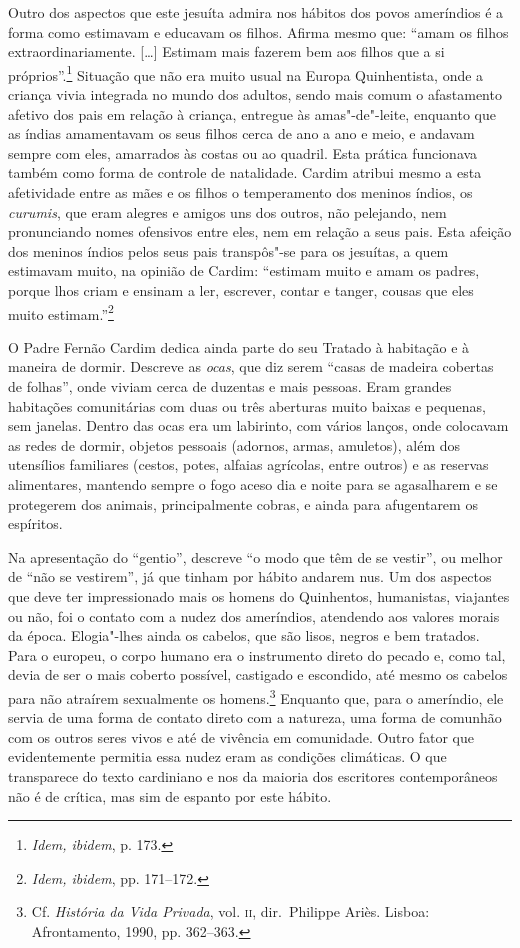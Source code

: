 Outro dos aspectos que este jesuíta admira nos hábitos dos povos
ameríndios é a forma como estimavam e educavam os filhos. Afirma mesmo
que: ``amam os filhos extraordinariamente. [\ldots{}] Estimam
mais fazerem bem aos filhos que a si próprios''.\footnote{ \textit{Idem, ibidem}, 
p. 173.} Situação que não era muito usual na
Europa Quinhentista, onde a criança vivia integrada no mundo dos
adultos, sendo mais comum o afastamento afetivo dos pais em relação à
criança, entregue às amas"-de"-leite, enquanto que as índias amamentavam
os seus filhos cerca de ano a ano e meio, e andavam sempre com eles,
amarrados às costas ou ao quadril. Esta prática funcionava também como
forma de controle de natalidade. Cardim atribui mesmo a esta
afetividade entre as mães e os filhos o temperamento dos meninos
índios, os \textit{curumis}, que eram alegres e amigos uns dos outros,
não pelejando, nem pronunciando nomes ofensivos entre eles, nem em
relação a seus pais. Esta afeição dos meninos índios pelos seus pais
transpôs"-se para os jesuítas, a quem estimavam muito, na opinião de
Cardim: ``estimam muito e amam os padres, porque lhos
criam e ensinam a ler, escrever, contar e tanger, cousas que eles muito
estimam.''\footnote{ \textit{Idem, ibidem}, pp. 171--172.} 

 O Padre Fernão Cardim dedica ainda parte do seu Tratado 
à habitação e à maneira de dormir. Descreve as \textit{ocas}, que diz
serem ``casas de madeira cobertas de folhas'', onde
viviam cerca de duzentas e mais pessoas. Eram grandes habitações
comunitárias com duas ou três aberturas muito baixas e pequenas, sem
janelas. Dentro das ocas era um labirinto, com vários lanços, 
onde colocavam as redes de dormir, objetos pessoais (adornos, armas, amuletos), além dos
utensílios familiares (cestos, potes, alfaias agrícolas, entre outros)
e as reservas alimentares, mantendo sempre o fogo aceso dia e noite
para se agasalharem e se protegerem dos animais, principalmente cobras,
e ainda para afugentarem os espíritos. 

 Na apresentação do ``gentio'', descreve ``o modo
que têm de se vestir'', ou melhor de ``não se vestirem'', já que
tinham por hábito andarem nus. Um dos aspectos que deve ter
impressionado mais os homens do Quinhentos, humanistas, viajantes ou
não, foi o contato com a nudez dos ameríndios, atendendo aos valores
morais da época. Elogia"-lhes ainda os cabelos, que são lisos, negros e
bem tratados. Para o europeu, o corpo humano era o instrumento direto
do pecado e, como tal, devia de ser o mais coberto possível, castigado
e escondido, até mesmo os cabelos para não atraírem sexualmente os
homens.\footnote{ Cf. \textit{História da Vida Privada}, vol. \textsc{ii},
dir.~Philippe Ariès. Lisboa: Afrontamento, 
1990, pp. 362--363.} Enquanto que, para o ameríndio, ele servia de uma forma de
contato direto com a natureza, uma forma de comunhão com os outros
seres vivos e até de vivência em comunidade. Outro fator que
evidentemente permitia essa nudez eram as condições climáticas. O que
transparece do texto cardiniano e nos da maioria dos escritores
contemporâneos não é de crítica, mas sim de espanto por este hábito.

